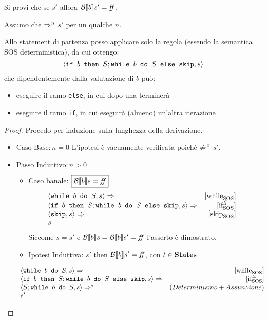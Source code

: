 {
 Si provi che se  \Rar{*} $s'$ allora
 $\B{b}' = \semfalse$.
}
{
Assumo che  $\Rar{n}$ $s'$ per un qualche $n$.

Allo statement di partenza posso applicare solo la regola \whileSOS
(essendo la semantica SOS deterministica), da cui ottengo:
$$
  \confSs{\ifABC{b}{S; \wbS{b}{S}}{\skipForFriends}}{s} 
$$
che dipendentemente dalla valutazione di $b$ può:
\begin{itemize}
  \item eseguire il ramo \texttt{else}, in cui dopo una 
    \skipForFriends{} terminerà 
  \item eseguire il ramo \texttt{if}, in cui eseguirà (almeno) 
    un'altra iterazione
\end{itemize}
\begin{proof}
Procedo per induzione sulla lunghezza della derivazione.

\begin{itemize}
  \item $\boxed{\text{Caso Base}: n = 0}$ L'ipotesi è vacuamente verificata
    poichè  $\not\Rar{0}$ $s'$.

  \item $\boxed{\text{Passo Induttivo}: n > 0}$
    \begin{itemize}
      \item Caso banale: $\boxed{\B{b} = \semfalse}$
        $$
        \begin{array}{lrr}
        \confSs{\wbS{b}{S}}{s} \Rar{} & \whileSOS & \\
        \confSs{\ifABC{b}{S; \wbS{b}{S}}{\skipForFriends}}{s}
            \Rar{} & \ifffSOS & \\
        \confSs{\skipForFriends}{s} \Rar{} & \skipSOS & \\
        s & & \\
        \end{array}
        $$
        Siccome $s = s'$ e $\B{b} = \B{b}' = \semfalse$ l'asserto è dimostrato.
      \item Ipotesi Induttiva:   $s'$ then
        $\B{b}' = \semfalse$, con $t\in\states$
    \end{itemize}
    $$
    \begin{array}{lrr}
    \confSs{\wbS{b}{S}}{s} \Rar{} & \whileSOS & \\
    \confSs{\ifABC{b}{S; \wbS{b}{S}}{\skipForFriends}}{s} \Rar{} & \ifttSOS & \\
    \confSs{S; \wbS{b}{S}}{s} \Rar{*} & (Determinismo + Assunzione) & \\
    s' & & \\
    \end{array}
    $$


\end{itemize}
\end{proof}}
